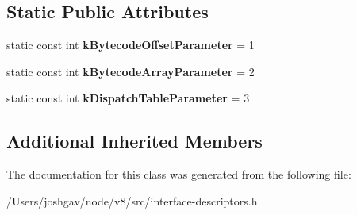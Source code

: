 \subsection*{Static Public Attributes}
\begin{DoxyCompactItemize}
\item 
static const int {\bfseries k\+Bytecode\+Offset\+Parameter} = 1\hypertarget{classv8_1_1internal_1_1_interpreter_dispatch_descriptor_a7f92c42bd7518f3f9619934d653333d1}{}\label{classv8_1_1internal_1_1_interpreter_dispatch_descriptor_a7f92c42bd7518f3f9619934d653333d1}

\item 
static const int {\bfseries k\+Bytecode\+Array\+Parameter} = 2\hypertarget{classv8_1_1internal_1_1_interpreter_dispatch_descriptor_ae47590660605ea9081682441a2b5b499}{}\label{classv8_1_1internal_1_1_interpreter_dispatch_descriptor_ae47590660605ea9081682441a2b5b499}

\item 
static const int {\bfseries k\+Dispatch\+Table\+Parameter} = 3\hypertarget{classv8_1_1internal_1_1_interpreter_dispatch_descriptor_aafda72101e1745695f34137f688b0608}{}\label{classv8_1_1internal_1_1_interpreter_dispatch_descriptor_aafda72101e1745695f34137f688b0608}

\end{DoxyCompactItemize}
\subsection*{Additional Inherited Members}


The documentation for this class was generated from the following file\+:\begin{DoxyCompactItemize}
\item 
/\+Users/joshgav/node/v8/src/interface-\/descriptors.\+h\end{DoxyCompactItemize}
